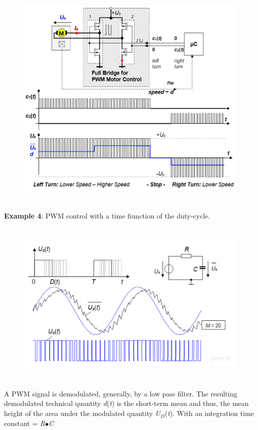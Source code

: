     \begin{figure}[h]
    \centering
    \includegraphics[width=15cm, height=11cm]{Images/image169.png}
    \label{fig:Fig }
    \end{figure}
\newpage

\textbf{ Example 4}:  PWM control with a time fiunction of the duty-cycle.

    \begin{figure}[h]
    \centering
    \includegraphics[width=14cm, height=8cm]{Images/image170.png}
    \label{fig:Fig }
    \end{figure}

A PWM signal is demodulated, generally, by a low pass filter. The resulting demodulated technical quantity \textit{d}(\textit{t}) is the short-term mean and thus, the mean height of the area under the modulated quantity \textit{U${}_{D}$}(\textit{t}). With an integration time constant  = \textit{R$\bullet$C} \\


